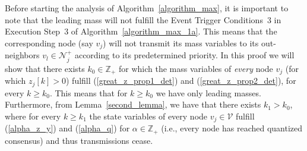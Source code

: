 \documentclass[twocolumn]{autart}    %
\let\mathbb=\mathds %
\begin{document}
\begin{pf}
Before starting the analysis of Algorithm~\ref{algorithm_max}, it is important to note that the leading mass will not fulfill the Event Trigger Conditions~$3$ in Execution Step~$3$ of Algorithm~\ref{algorithm_max_1a}. 
This means that the corresponding node (say $v_j$) will not transmit its mass variables to its out-neighbors $v_l \in \mathcal{N}_j^+$ according to its predetermined priority. 
In this proof we will show that there exists $k_0 \in \mathbb{Z}_+$ for which the mass variables of {\em every} node $v_j$ (for which $z_j[k] > 0$) fulfill (\ref{great_z_prop1_det}) and (\ref{great_z_prop2_det}), for every $k \geq k_0$. 
This means that for $k \geq k_0$ we have only leading masses. 
Furthermore, from Lemma~\ref{second_lemma}, we have that there exists $k_1 > k_0$, where for every $k \geq k_1$ the state variables of every node $v_j \in \mathcal{V}$ fulfill (\ref{alpha_z_y}) and (\ref{alpha_q}) for $\alpha \in \mathbb{Z}_+$ (i.e., every node has reached quantized consensus) and thus transmissions cease. 



\end{pf}
\end{document}
